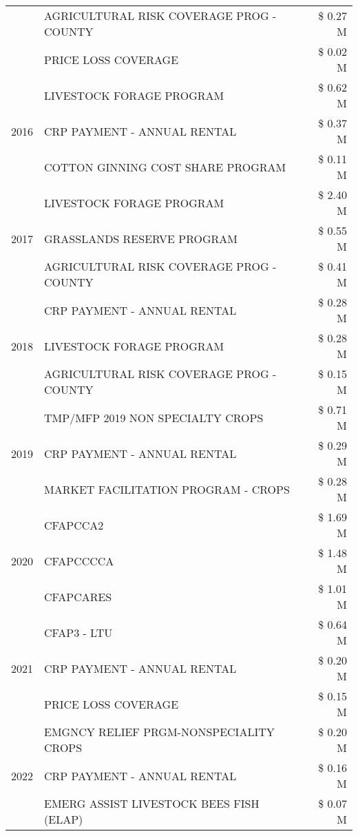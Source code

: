 \begin{tabular}{llr}
 & AGRICULTURAL RISK COVERAGE PROG - COUNTY & \$ 0.27 M \\
 & PRICE LOSS COVERAGE & \$ 0.02 M \\
\cline{1-3}
\multirow[t]{3}{*}{2016} & LIVESTOCK FORAGE PROGRAM & \$ 0.62 M \\
 & CRP PAYMENT - ANNUAL RENTAL & \$ 0.37 M \\
 & COTTON GINNING COST SHARE PROGRAM & \$ 0.11 M \\
\cline{1-3}
\multirow[t]{3}{*}{2017} & LIVESTOCK FORAGE PROGRAM & \$ 2.40 M \\
 & GRASSLANDS RESERVE PROGRAM & \$ 0.55 M \\
 & AGRICULTURAL RISK COVERAGE PROG - COUNTY & \$ 0.41 M \\
\cline{1-3}
\multirow[t]{3}{*}{2018} & CRP PAYMENT - ANNUAL RENTAL & \$ 0.28 M \\
 & LIVESTOCK FORAGE PROGRAM & \$ 0.28 M \\
 & AGRICULTURAL RISK COVERAGE PROG - COUNTY & \$ 0.15 M \\
\cline{1-3}
\multirow[t]{3}{*}{2019} & TMP/MFP 2019 NON SPECIALTY CROPS & \$ 0.71 M \\
 & CRP PAYMENT - ANNUAL RENTAL & \$ 0.29 M \\
 & MARKET FACILITATION PROGRAM - CROPS & \$ 0.28 M \\
\cline{1-3}
\multirow[t]{3}{*}{2020} & CFAPCCA2 & \$ 1.69 M \\
 & CFAPCCCCA & \$ 1.48 M \\
 & CFAPCARES & \$ 1.01 M \\
\cline{1-3}
\multirow[t]{3}{*}{2021} & CFAP3 - LTU & \$ 0.64 M \\
 & CRP PAYMENT - ANNUAL RENTAL & \$ 0.20 M \\
 & PRICE LOSS COVERAGE & \$ 0.15 M \\
\cline{1-3}
\multirow[t]{3}{*}{2022} & EMGNCY RELIEF PRGM-NONSPECIALITY CROPS & \$ 0.20 M \\
 & CRP PAYMENT - ANNUAL RENTAL & \$ 0.16 M \\
 & EMERG ASSIST LIVESTOCK BEES FISH (ELAP) & \$ 0.07 M \\
\cline{1-3}
\bottomrule
\end{tabular}
